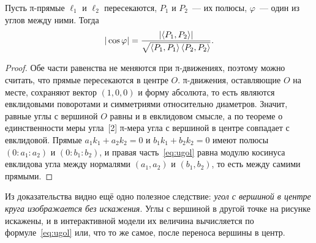 \begin{proposition}\label{prop:ugol}
Пусть π-прямые $\ell_1$ и $\ell_2$ пересекаются, $P_1$ и $P_2$~--- их полюсы, $\varphi$~--- один из углов между ними. Тогда
\begin{equation}\label{eq:ugol}
|\cos\varphi|=\frac{|\langle P_1,P_2\rangle|}{\sqrt{\langle P_1,P_1\rangle\,\langle P_2,P_2\rangle}}.
\end{equation}
\end{proposition}
\begin{proof}
Обе части равенства не меняются при π-движениях, поэтому можно считать, что прямые пересекаются в центре $O$. π-движения, оставляющие $O$ на месте, сохраняют вектор $(1,0,0)$ и форму абсолюта, то есть являются евклидовыми поворотами и симметриями относительно диаметров. Значит, равные углы с вершиной $O$ равны и в евклидовом смысле, а по теореме о единственности меры угла~[2] π-мера угла с вершиной в центре совпадает с евклидовой. Прямые $a_1k_1+a_2k_2=0$ и $b_1k_1+b_2k_2=0$ имеют полюсы $(0:a_1:a_2)$ и $(0:b_1:b_2)$, и правая часть~\eqref{eq:ugol} равна модулю косинуса евклидова угла между нормалями $(a_1,a_2)$ и $(b_1,b_2)$, то есть между самими прямыми.
\end{proof}

Из доказательства видно ещё одно полезное следствие: \emph{угол с вершиной в центре круга изображается без искажения}. Углы с вершиной в другой точке на рисунке искажены, и в интерактивной модели их величина вычисляется по формуле~\eqref{eq:ugol} или, что то же самое, после переноса вершины в центр.
